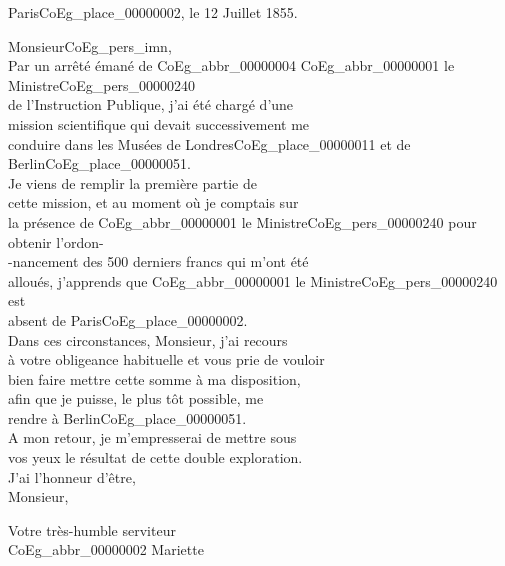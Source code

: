\documentclass{book}
\begin{document}
\begin{flushright}Paris\gls{CoEg_place_00000002}, le 12 Juillet 1855.\end{flushright}
\hspace{1cm} Monsieur\gls{CoEg_pers_imn},\\

\indent Par un arrêté émané de \gls{CoEg_abbr_00000004} \gls{CoEg_abbr_00000001} le Ministre\gls{CoEg_pers_00000240}\\
de l’Instruction Publique, j’ai été chargé d’une\\
mission scientifique qui devait successivement me\\
conduire dans les Musées de Londres\gls{CoEg_place_00000011} et de Berlin\gls{CoEg_place_00000051}.\\
\indent Je viens de remplir la première partie de\\
cette mission, et au moment où je comptais sur\\
la présence de \gls{CoEg_abbr_00000001} le Ministre\gls{CoEg_pers_00000240} pour obtenir l’ordon-\\
-nancement des 500 derniers francs qui m’ont été\\
alloués, j’apprends que \gls{CoEg_abbr_00000001} le Ministre\gls{CoEg_pers_00000240} est\\
absent de Paris\gls{CoEg_place_00000002}.\\
\indent Dans ces circonstances, Monsieur, j’ai recours\\
à votre obligeance habituelle et vous prie de vouloir\\
bien faire mettre cette somme à ma disposition,\\
afin que je puisse, le plus tôt possible, me\\
rendre à Berlin\gls{CoEg_place_00000051}.\\
\indent A mon retour, je m’empresserai de mettre sous\\
vos yeux le résultat de cette double exploration.\\
\indent J’ai l’honneur d’être,\\
\indent \hspace{1cm}Monsieur,
\begin{center}\hspace{5cm}Votre très-humble serviteur\\
\hspace{5cm}\gls{CoEg_abbr_00000002} Mariette\end{center}

\hypertarget{CoEg_Mariette_1855-08-06}{}
\end{document}
